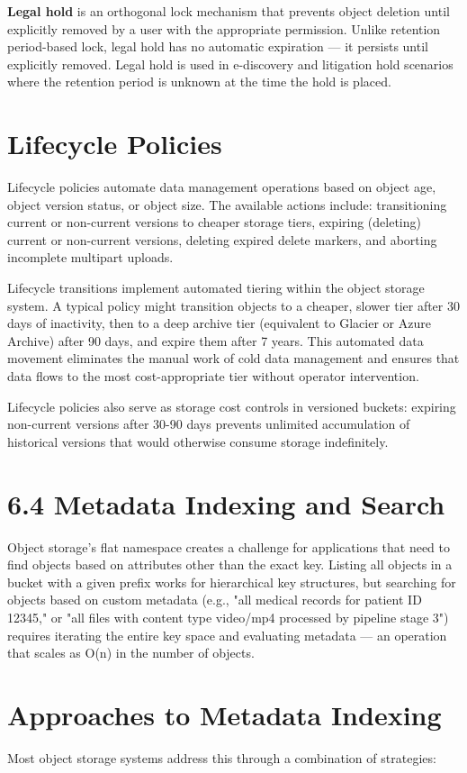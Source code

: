 \textbf{Legal hold} is an orthogonal lock mechanism that prevents object deletion until explicitly removed by a user with the appropriate permission. Unlike retention period-based lock, legal hold has no automatic expiration --- it persists until explicitly removed. Legal hold is used in e-discovery and litigation hold scenarios where the retention period is unknown at the time the hold is placed.

\section{Lifecycle Policies}
Lifecycle policies automate data management operations based on object age, object version status, or object size. The available actions include: transitioning current or non-current versions to cheaper storage tiers, expiring (deleting) current or non-current versions, deleting expired delete markers, and aborting incomplete multipart uploads.

Lifecycle transitions implement automated tiering within the object storage system. A typical policy might transition objects to a cheaper, slower tier after 30 days of inactivity, then to a deep archive tier (equivalent to Glacier or Azure Archive) after 90 days, and expire them after 7 years. This automated data movement eliminates the manual work of cold data management and ensures that data flows to the most cost-appropriate tier without operator intervention.

Lifecycle policies also serve as storage cost controls in versioned buckets: expiring non-current versions after 30-90 days prevents unlimited accumulation of historical versions that would otherwise consume storage indefinitely.

\section{6.4 Metadata Indexing and Search}
Object storage's flat namespace creates a challenge for applications that need to find objects based on attributes other than the exact key. Listing all objects in a bucket with a given prefix works for hierarchical key structures, but searching for objects based on custom metadata (e.g., "all medical records for patient ID 12345," or "all files with content type video/mp4 processed by pipeline stage 3") requires iterating the entire key space and evaluating metadata --- an operation that scales as O(n) in the number of objects.

\section{Approaches to Metadata Indexing}
Most object storage systems address this through a combination of strategies:

